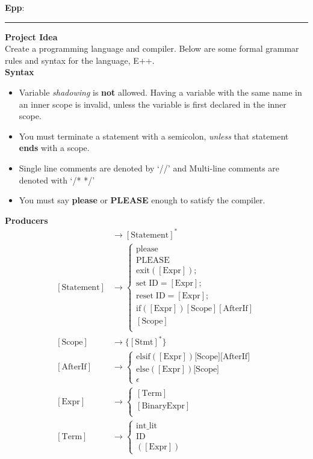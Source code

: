 \documentclass[11pt]{article}
\newcommand{\hwheadings}[3]{
{{\bf Epp}: \chapsec } \hfill {{ \yourname }} \hfill {{ \course #1}}
\rule[0.051in]{\textwidth}{0.0025in}
}
\begin{document}
\hwheadings{}{}{}

\textbf{Project Idea} \\
Create a programming language and compiler. Below are some formal grammar rules 
and syntax for the language, E++. \\

\textbf{Syntax}
\begin{itemize}
  \item Variable \textit{shadowing} is \textbf{not} allowed. Having a variable with the same name 
    in an inner scope is invalid, unless the variable is first 
    declared in the inner scope. 
  \item You must terminate a statement with a semicolon, \textit{unless} that 
    statement \textbf{ends} with a scope. 
  \item Single line comments are denoted by `//' and Multi-line comments are denoted with `/* */'
  \item You must say \textbf{please} or \textbf{PLEASE} enough to satisfy the compiler.
\end{itemize}

\textbf{Producers}
\begin{align*}
  [\text{Program}] &\to [\text{Statement}]^* \\
  [\text{Statement}] &\to 
  \begin{cases}
    \text{please} \\
    \text{PLEASE} \\
    \text{exit}([\text{Expr}]); \\ 
    \text{set} \; \text{ID} = [\text{Expr}]; \\
    \text{reset} \; \text{ID} = [\text{Expr}]; \\
    \text{if} ([\text{Expr}])[\text{Scope}][\text{AfterIf}]  \\
    [\text{Scope}] \\
  \end{cases} \\
  [\text{Scope}] &\to \{[\text{Stmt}]^*\} \\
  [\text{AfterIf}] &\to 
  \begin{cases}
    \text{elsif}([\text{Expr}])\text{[Scope]}\text{[AfterIf]} \\
    \text{else}([\text{Expr}])\text{[Scope]} \\
    \epsilon
  \end{cases} \\
  [\text{Expr}] &\to 
  \begin{cases}
  [\text{Term}] \\ 
  [\text{BinaryExpr}] \\
  \end{cases} \\
  [\text{Term}] &\to
  \begin{cases}
    \text{int\_lit} \\ 
    \text{ID} \\ 
    \left([\text{Expr}]\right)
  \end{cases} \\
\end{align*}
\end{document}
